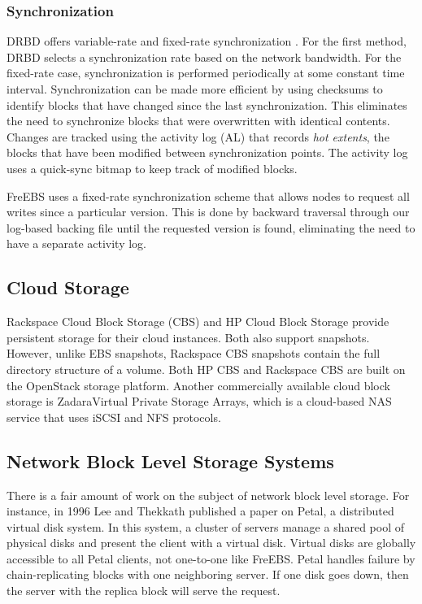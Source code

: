 \subsubsection{Synchronization} 
DRBD\textsuperscript{\textregistered} offers 
variable-rate and fixed-rate synchronization \cite{drbd_manual}.
For the first method, DRBD\textsuperscript{\textregistered} selects a 
synchronization rate
based on the network bandwidth. For the fixed-rate case, synchronization is
performed periodically at some constant time interval. Synchronization 
can be made more efficient by using checksums to identify blocks that have 
changed since the last synchronization. This eliminates the need to 
synchronize blocks that were overwritten with identical contents. Changes
are tracked using the activity log (AL) that records \emph{hot extents}, 
the blocks that have been modified between synchronization points. The 
activity log uses a quick-sync bitmap to keep track of modified blocks.

FreEBS uses a fixed-rate synchronization scheme that allows nodes to request 
all writes since a particular version. This is done by backward traversal 
through our log-based backing file until the requested version is found, 
eliminating the need to have a separate activity log.


\subsection{Cloud Storage}
Rackspace Cloud Block Storage (CBS) and HP Cloud Block Storage provide 
persistent storage for their cloud instances\cite{rackspace, hp}. Both also 
support snapshots. However, unlike EBS snapshots, Rackspace CBS snapshots
contain the 
full directory structure of a volume. Both HP CBS and Rackspace CBS are 
built on the OpenStack storage platform. Another commercially available 
cloud block storage is Zadara\texttrademark Virtual Private Storage 
Arrays\cite{zadara}, which is a cloud-based NAS service that uses iSCSI 
and NFS protocols.  

\subsection{Network Block Level Storage Systems}
There is a fair amount of work on the subject of network block level storage.
For instance, in 1996 Lee and Thekkath published a paper on Petal, a 
distributed virtual disk system\cite{lee1996petal}. In this system, a cluster
of servers manage a shared pool of physical disks and present the client 
with a virtual disk. Virtual disks are globally accessible to all
Petal clients, not one-to-one like FreEBS. Petal handles failure by 
chain-replicating blocks with one neighboring server. If one disk goes down,
then the server with the replica block will serve the request. 

